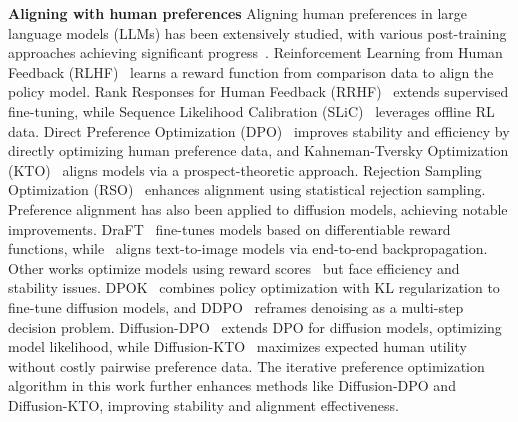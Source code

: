 \vspace{0.5\baselineskip}
\noindent\textbf{Aligning with human preferences}
Aligning human preferences in large language models (LLMs) has been extensively studied, with various post-training approaches achieving significant progress~\cite{ouyang2022traininglanguagemodelsfollow, ramamurthy2023reinforcementlearningnotnatural, zheng2023secretsrlhflargelanguage}. Reinforcement Learning from Human Feedback (RLHF)~\cite{ouyang2022traininglanguagemodelsfollow} learns a reward function from comparison data to align the policy model. Rank Responses for Human Feedback (RRHF)~\cite{yuan2023rrhfrankresponsesalign} extends supervised fine-tuning, while Sequence Likelihood Calibration (SLiC)~\cite{zhao2023slichfsequencelikelihoodcalibration} leverages offline RL data. Direct Preference Optimization (DPO)~\cite{rafailov2024directpreferenceoptimizationlanguage} improves stability and efficiency by directly optimizing human preference data, and Kahneman-Tversky Optimization (KTO)~\cite{ethayarajh2024ktomodelalignmentprospect} aligns models via a prospect-theoretic approach. Rejection Sampling Optimization (RSO)~\cite{liu2024statisticalrejectionsamplingimproves} enhances alignment using statistical rejection sampling. Preference alignment has also been applied to diffusion models, achieving notable improvements. DraFT~\cite{clark2024directlyfinetuningdiffusionmodels} fine-tunes models based on differentiable reward functions, while~\cite{prabhudesai2024aligningtexttoimagediffusionmodels} aligns text-to-image models via end-to-end backpropagation. Other works optimize models using reward scores~\cite{xu2023imagerewardlearningevaluatinghuman} but face efficiency and stability issues. DPOK~\cite{fan2023dpokreinforcementlearningfinetuning} combines policy optimization with KL regularization to fine-tune diffusion models, and DDPO~\cite{black2024trainingdiffusionmodelsreinforcement} reframes denoising as a multi-step decision problem. Diffusion-DPO~\cite{wallace2023diffusionmodelalignmentusing} extends DPO for diffusion models, optimizing model likelihood, while Diffusion-KTO~\cite{li2024aligningdiffusionmodelsoptimizing} maximizes expected human utility without costly pairwise preference data. The iterative preference optimization algorithm in this work further enhances methods like Diffusion-DPO and Diffusion-KTO, improving stability and alignment effectiveness.
\fi

